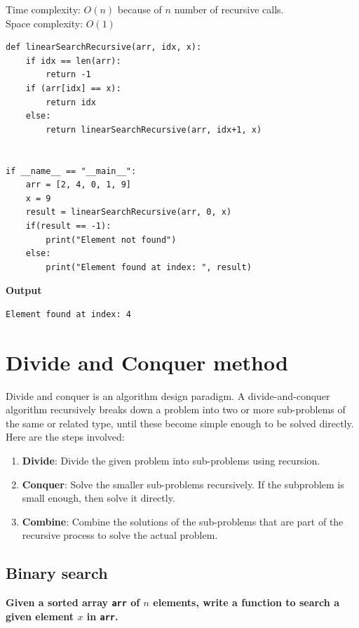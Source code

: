 \documentclass[a4paper,11pt]{book}
\begin{document}
\noindent Time complexity: $O(n)$ because of $n$ number of recursive calls.\\
\noindent Space complexity: $O(1)$

\begin{lstlisting}
def linearSearchRecursive(arr, idx, x):
    if idx == len(arr):
        return -1
    if (arr[idx] == x):
        return idx
    else:
        return linearSearchRecursive(arr, idx+1, x)


if __name__ == "__main__":
    arr = [2, 4, 0, 1, 9]
    x = 9
    result = linearSearchRecursive(arr, 0, x)
    if(result == -1):
        print("Element not found")
    else:
        print("Element found at index: ", result)
\end{lstlisting}
\textbf{Output}
\begin{lstlisting}
Element found at index: 4
\end{lstlisting}


\section{Divide and Conquer method}

\noindent Divide and conquer is an algorithm design paradigm. A divide-and-conquer algorithm recursively breaks down a problem into two or more sub-problems of the same or related type, until these become simple enough to be solved directly. Here are the steps involved:
\begin{enumerate}
    \item \textbf{Divide}: Divide the given problem into sub-problems using recursion.
    \item \textbf{Conquer}: Solve the smaller sub-problems recursively. If the subproblem is small enough, then solve it directly.
    \item \textbf{Combine}: Combine the solutions of the sub-problems that are part of the recursive process to solve the actual problem.
\end{enumerate}
\subsection{Binary search}

\textbf{Given a sorted array \lstinline{arr} of $n$ elements, write a function to search a given element $x$ in \lstinline{arr}.}
\vspace{4mm}
\end{document}
